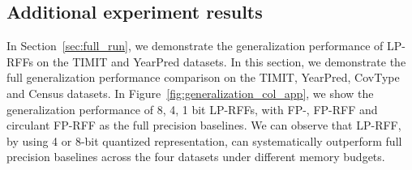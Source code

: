 \subsection{Additional experiment results}
\label{subsec:app_additional_exp_res}
In Section~\ref{sec:full_run}, we demonstrate the generalization performance of LP-RFFs on the TIMIT and YearPred datasets. In this section, we demonstrate the full generalization performance comparison on the TIMIT, YearPred, CovType and Census datasets. In Figure~\ref{fig:generalization_col_app}, we show the generalization performance of 8, 4, 1 bit LP-RFFs, with FP-\Nystrom, FP-RFF and circulant FP-RFF as the full precision baselines. We can observe that LP-RFF, by using 4 or 8-bit quantized representation, can systematically outperform full precision baselines across the four datasets under different memory budgets.
